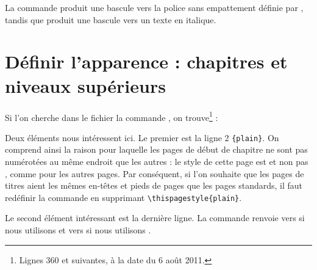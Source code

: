 La commande  produit une bascule vers la police sans empattement définie par , tandis que  produit une bascule vers un texte en italique.

\section{Définir l'apparence : chapitres et niveaux supérieurs}

Si l'on cherche dans le fichier  la commande , on trouve\footnote{Lignes 360 et suivantes, à la date du 6 août 2011.} :

\begin{latexcode}
\newcommand\chapter{\if@openright\cleardoublepage\else\clearpage\fi
                    \thispagestyle{plain}%
                    \global\@topnum\z@
                    \@afterindentfalse
                    \secdef\@chapter\@schapter}
\end{latexcode}

Deux éléments nous intéressent ici. Le premier est la ligne 2 \verb|{plain}|. On comprend ainsi la raison pour laquelle les  pages de début de chapitre ne sont pas numérotées au même endroit que les autres : le style de cette page est  et non pas , comme pour les autres pages. Par conséquent, si l'on souhaite que les pages de titres aient les mêmes en-têtes et pieds de pages que les pages standards, il faut redéfinir la commande  en supprimant \verb|\thispagestyle{plain}|.\label{entetechapter}\label{chapitrepagestyle}

\begin{latexcode}
\makeatletter
\renewcommand\chapter{\if@openright\cleardoublepage %
                    \else\clearpage\fi
                    \global\@topnum\z@
                    \@afterindentfalse
                    \secdef\@chapter\@schapter}
\makeatother
\end{latexcode}

Le second élément intéressant est la dernière ligne. La commande  renvoie vers  si nous utilisons  et vers  si nous utilisons .

